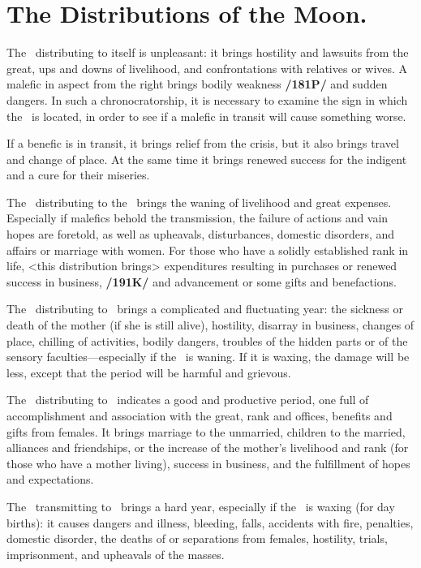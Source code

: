 \section{The Distributions of the Moon.}

The \Moon\, distributing to itself is unpleasant: it brings hostility and lawsuits from the great, ups and downs of livelihood, and confrontations with relatives or wives. A malefic in aspect from the right brings bodily weakness \textbf{/181P/} and sudden dangers. In such a chronocratorship, it is necessary to examine the sign in which the \Moon\, is located, in order to see if a malefic in transit will cause something worse. 

If a benefic is in transit, it brings relief from the crisis, but it also brings travel and change of place. At the same time it brings renewed success for the indigent and a cure for their miseries.

The \Moon\, distributing to the \Sun\, brings the waning of livelihood and great expenses. Especially if malefics behold the transmission, the failure of actions and vain hopes are foretold, as well as upheavals, disturbances, domestic disorders, and affairs or marriage with women. For those who have a solidly established rank in life, <this distribution brings> expenditures resulting in purchases or renewed success in business, \textbf{/191K/} and advancement or some gifts and benefactions.

The \Moon\, distributing to \Saturn\, brings a complicated and fluctuating year: the sickness or death of the
mother (if she is still alive), hostility, disarray in business, changes of place, chilling of activities, bodily
dangers, troubles of the hidden parts or of the sensory faculties—especially if the \Moon\, is waning. If it is
waxing, the damage will be less, except that the period will be harmful and grievous.

The \Moon\, distributing to \Jupiter\, indicates a good and productive period, one full of accomplishment and association with the great, rank and offices, benefits and gifts from females. It brings marriage to the unmarried, children to the married, alliances and friendships, or the increase of the mother’s livelihood and rank (for those who have a mother living), success in business, and the fulfillment of hopes and expectations.

The \Moon\, transmitting to \Mars\, brings a hard year, especially if the \Moon\, is waxing (for day births): it causes dangers and illness, bleeding, falls, accidents with fire, penalties, domestic disorder, the deaths of or separations from females, hostility, trials, imprisonment, and upheavals of the masses. 

